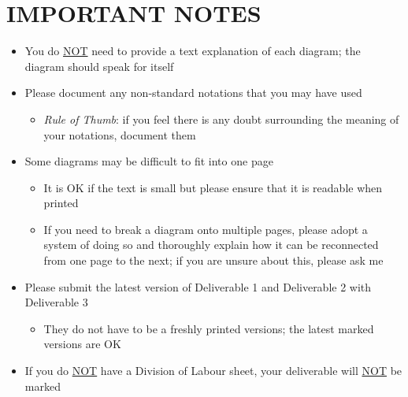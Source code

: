 \documentclass[]{article}
\begin{document}
\newpage
\section*{IMPORTANT NOTES}
\begin{itemize}
	\item You do \underline{NOT} need to provide a text explanation of each diagram; the diagram should speak for itself
	\item Please document any non-standard notations that you may have used
	\begin{itemize}
		\item \emph{Rule of Thumb}: if you feel there is any doubt surrounding the meaning of your notations, document them
	\end{itemize}
	\item Some diagrams may be difficult to fit into one page
	\begin{itemize}
		\item It is OK if the text is small but please ensure that it is readable when printed
		\item If you need to break a diagram onto multiple pages, please adopt a system of doing so and thoroughly explain how it can be reconnected from one page to the next; if you are unsure about this, please ask me
	\end{itemize}
	\item Please submit the latest version of Deliverable 1 and Deliverable 2 with Deliverable 3
	\begin{itemize}
		\item They do not have to be a freshly printed versions; the latest marked versions are OK
	\end{itemize}
	\item If you do \underline{NOT} have a Division of Labour sheet, your deliverable will \underline{NOT} be marked
\end{itemize}
\end{document}
